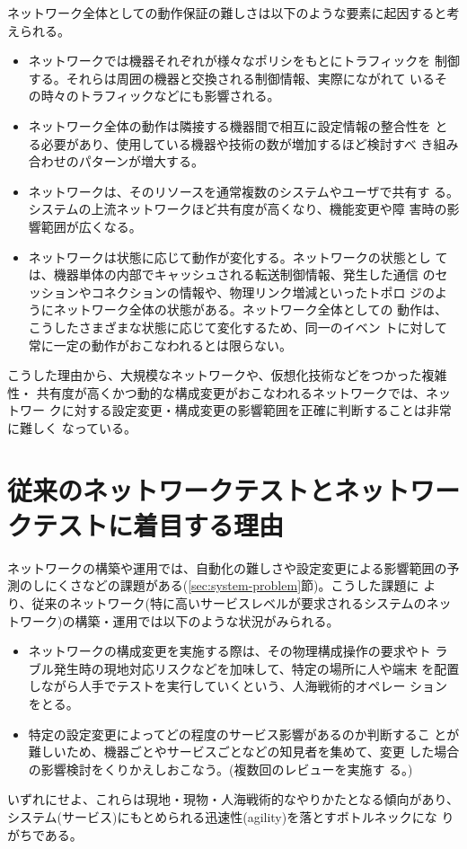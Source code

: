 ネットワーク全体としての動作保証の難しさは以下のような要素に起因すると考
えられる。
\begin{itemize}
 \item ネットワークでは機器それぞれが様々なポリシをもとにトラフィックを
       制御する。それらは周囲の機器と交換される制御情報、実際にながれて
       いるその時々のトラフィックなどにも影響される。
 \item ネットワーク全体の動作は隣接する機器間で相互に設定情報の整合性を
       とる必要があり、使用している機器や技術の数が増加するほど検討すべ
       き組み合わせのパターンが増大する。
 \item ネットワークは、そのリソースを通常複数のシステムやユーザで共有す
       る。システムの上流ネットワークほど共有度が高くなり、機能変更や障
       害時の影響範囲が広くなる。
 \item ネットワークは状態に応じて動作が変化する。ネットワークの状態とし
       ては、機器単体の内部でキャッシュされる転送制御情報、発生した通信
       のセッションやコネクションの情報や、物理リンク増減といったトポロ
       ジのようにネットワーク全体の状態がある。ネットワーク全体としての
       動作は、こうしたさまざまな状態に応じて変化するため、同一のイベン
       トに対して常に一定の動作がおこなわれるとは限らない。
\end{itemize}
こうした理由から、大規模なネットワークや、仮想化技術などをつかった複雑性・
共有度が高くかつ動的な構成変更がおこなわれるネットワークでは、ネットワー
クに対する設定変更・構成変更の影響範囲を正確に判断することは非常に難しく
なっている。

  \section{従来のネットワークテストとネットワークテストに着目する理由}


ネットワークの構築や運用では、自動化の難しさや設定変更による影響範囲の予
測のしにくさなどの課題がある(\ref{sec:system-problem}節)。こうした課題に
より、従来のネットワーク(特に高いサービスレベルが要求されるシステムのネッ
トワーク)の構築・運用では以下のような状況がみられる。
\begin{itemize}
 \item ネットワークの構成変更を実施する際は、その物理構成操作の要求やト
       ラブル発生時の現地対応リスクなどを加味して、特定の場所に人や端末
       を配置しながら人手でテストを実行していくという、人海戦術的オペレー
       ションをとる。
 \item 特定の設定変更によってどの程度のサービス影響があるのか判断するこ
       とが難しいため、機器ごとやサービスごとなどの知見者を集めて、変更
       した場合の影響検討をくりかえしおこなう。(複数回のレビューを実施す
       る。)
\end{itemize}
いずれにせよ、これらは現地・現物・人海戦術的なやりかたとなる傾向があり、
システム(サービス)にもとめられる迅速性(agility)を落とすボトルネックにな
りがちである。

